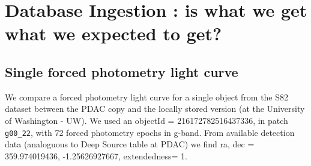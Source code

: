 \documentclass[DM,lsstdraft,toc]{lsstdoc}
\begin{document}
\section{Database Ingestion : is what we get what we expected to get? }
\label{sec:dg}

\subsection{Single forced photometry light curve}

We compare a forced photometry light curve for a single object from the S82 dataset between the PDAC copy and the locally stored version (at the University of Washington - UW). We used an objectId = 216172782516437336, in patch \verb|g00_22|, with  72 forced photometry epochs in g-band. From available detection data (analoguous to Deep Source table at PDAC) we find ra, dec = 359.974019436\degree,  -1.25626927667\degree, extendedness= 1.
\end{document}
